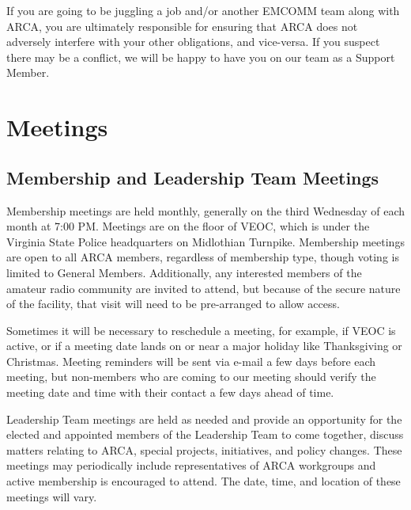 \documentclass[pdflatex,letterpaper,twoside,12pt]{book}
\begin{document}
If you are going to be juggling a job and/or another EMCOMM team along with ARCA, you are ultimately responsible for ensuring that ARCA does not adversely interfere with your other obligations, and vice-versa.  If you suspect there may be a conflict, we will be happy to have you on our team as a Support Member.


\chapter{Meetings}

\section{Membership and Leadership Team Meetings}

Membership meetings are held monthly, generally on the third Wednesday of each month at 7:00 PM.  Meetings are on the floor of VEOC, which is under the Virginia State Police headquarters on Midlothian Turnpike.  Membership meetings are open to all ARCA members, regardless of membership type, though voting is limited to General Members.  Additionally, any interested members of the amateur radio community are invited to attend, but because of the secure nature of the facility, that visit will need to be pre-arranged to allow access.

Sometimes it will be necessary to reschedule a meeting, for example, if VEOC is active, or if a meeting date lands on or near a major holiday like Thanksgiving or Christmas.  Meeting reminders will be sent via e-mail a few days before each meeting, but non-members who are coming to our meeting should verify the meeting date and time with their contact a few days ahead of time.

Leadership Team meetings are held as needed and provide an opportunity for the elected and appointed members of the Leadership Team to come together, discuss matters relating to ARCA, special projects, initiatives, and policy changes.  These meetings may periodically include representatives of ARCA workgroups and active membership is encouraged to attend.  The date, time, and location of these meetings will vary.
\end{document}
